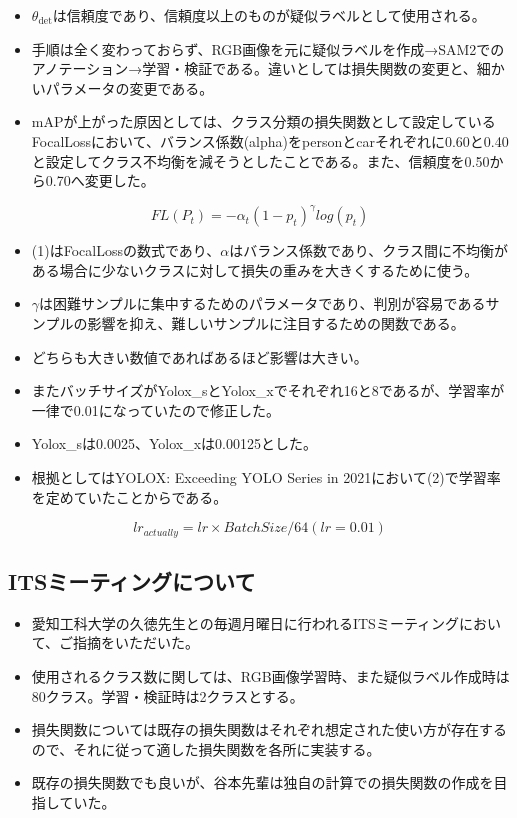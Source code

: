 \documentclass[a4j]{jarticle}
\begin{document}
	\begin{itemize}
		\item $\theta_{\mathrm{det}}$は信頼度であり、信頼度以上のものが疑似ラベルとして使用される。
		\item 手順は全く変わっておらず、RGB画像を元に疑似ラベルを作成→SAM2でのアノテーション→学習・検証である。違いとしては損失関数の変更と、細かいパラメータの変更である。
		\item mAPが上がった原因としては、クラス分類の損失関数として設定しているFocalLossにおいて、バランス係数(alpha)をpersonとcarそれぞれに0.60と0.40と設定してクラス不均衡を減そうとしたことである。また、信頼度を0.50から0.70へ変更した。
	\end{itemize}
	\begin{equation}
		FL (P_t) = - \alpha _ t(1 - p_t)^ \gamma log(p_t)
	\end{equation}
	\begin{itemize}
		\item (1)はFocalLossの数式であり、$\alpha$はバランス係数であり、クラス間に不均衡がある場合に少ないクラスに対して損失の重みを大きくするために使う。\cite{FocalLoss}
		\item $\gamma$は困難サンプルに集中するためのパラメータであり、判別が容易であるサンプルの影響を抑え、難しいサンプルに注目するための関数である。
		\item どちらも大きい数値であればあるほど影響は大きい。
	\end{itemize}
		\begin{itemize}
		\item またバッチサイズがYolox\_sとYolox\_xでそれぞれ16と8であるが、学習率が一律で0.01になっていたので修正した。
		\item Yolox\_sは0.0025、Yolox\_xは0.00125とした。
		\item 根拠としてはYOLOX: Exceeding YOLO Series in 2021において(2)で学習率を定めていたことからである。\cite{learning_rate}
	\end{itemize}
	\begin{equation}
		lr_{actually} = lr × BatchSize / 64 (lr=0.01)
	\end{equation}
	\subsection{ITSミーティングについて}
	\begin{itemize}
		\item 愛知工科大学の久徳先生との毎週月曜日に行われるITSミーティングにおいて、ご指摘をいただいた。
		\item 使用されるクラス数に関しては、RGB画像学習時、また疑似ラベル作成時は80クラス。学習・検証時は2クラスとする。
		\item 損失関数については既存の損失関数はそれぞれ想定された使い方が存在するので、それに従って適した損失関数を各所に実装する。
		\item 既存の損失関数でも良いが、谷本先輩は独自の計算での損失関数の作成を目指していた。
	\end{itemize}
\end{document}

